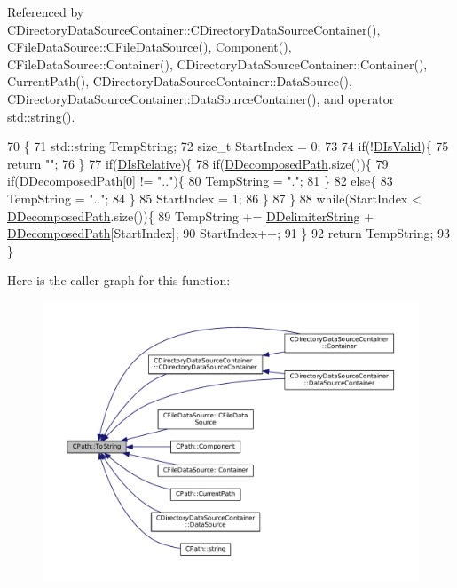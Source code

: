 Referenced by C\+Directory\+Data\+Source\+Container\+::\+C\+Directory\+Data\+Source\+Container(), C\+File\+Data\+Source\+::\+C\+File\+Data\+Source(), Component(), C\+File\+Data\+Source\+::\+Container(), C\+Directory\+Data\+Source\+Container\+::\+Container(), Current\+Path(), C\+Directory\+Data\+Source\+Container\+::\+Data\+Source(), C\+Directory\+Data\+Source\+Container\+::\+Data\+Source\+Container(), and operator std\+::string().


\begin{DoxyCode}
70                                \{
71     std::string TempString;
72     \textcolor{keywordtype}{size\_t} StartIndex = 0;
73     
74     \textcolor{keywordflow}{if}(!\hyperlink{classCPath_a992aca27a1cba1c3bae3d04438821192}{DIsValid})\{
75         \textcolor{keywordflow}{return} \textcolor{stringliteral}{""};    
76     \}
77     \textcolor{keywordflow}{if}(\hyperlink{classCPath_af705ff149bb2281c67afb84fff550eb9}{DIsRelative})\{
78         \textcolor{keywordflow}{if}(\hyperlink{classCPath_a03ed25209a01e633c107a0c877fc61f8}{DDecomposedPath}.size())\{
79             \textcolor{keywordflow}{if}(\hyperlink{classCPath_a03ed25209a01e633c107a0c877fc61f8}{DDecomposedPath}[0] != \textcolor{stringliteral}{".."})\{
80                 TempString = \textcolor{stringliteral}{"."};   
81             \}
82             \textcolor{keywordflow}{else}\{
83                 TempString = \textcolor{stringliteral}{".."};
84             \}
85             StartIndex = 1;
86         \}
87     \}
88     \textcolor{keywordflow}{while}(StartIndex < \hyperlink{classCPath_a03ed25209a01e633c107a0c877fc61f8}{DDecomposedPath}.size())\{
89         TempString += \hyperlink{classCPath_a88b8652d01ff3359a48dd75126cc5776}{DDelimiterString} + \hyperlink{classCPath_a03ed25209a01e633c107a0c877fc61f8}{DDecomposedPath}[StartIndex];
90         StartIndex++;
91     \}
92     \textcolor{keywordflow}{return} TempString;
93 \}
\end{DoxyCode}
Here is the caller graph for this function\+:\nopagebreak
\begin{figure}[H]
\begin{center}
\leavevmode
\includegraphics[width=350pt]{classCPath_abbafaf377a7e38e0151bd9567d526951_icgraph}
\end{center}
\end{figure}


